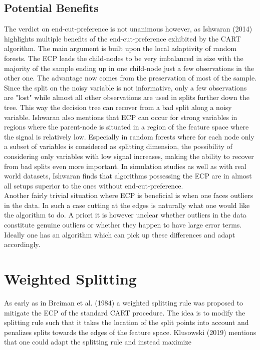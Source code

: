 \documentclass{article}
\begin{document}
\subsection{Potential Benefits}
The verdict on end-cut-preference is not unanimous however, as Ishwaran (2014) highlights multiple benefits of the end-cut-preference exhibited by the CART algorithm. The main argument is built upon the local adaptivity of random forests. The ECP leads the child-nodes to be very imbalanced in size with the majority of the sample ending up in one child-node just a few observations in the other one. The advantage now comes from the preservation of most of the sample. Since the split on the noisy variable is not informative, only a few observations are "lost" while almost all other observations are used in splits further down the tree. This way the decision tree can recover from a bad split along a noisy variable. Ishwaran also mentions that ECP can occur for strong variables in regions where the parent-node is situated in a region of the feature space where the signal is relatively low. Especially in random forests where for each node only a subset of variables is considered as splitting dimension, the possibility of considering only variables with low signal increases, making the ability to recover from bad splits even more important. In simulation studies as well as with real world datasets, Ishwaran finds that algorithms possessing the ECP are in almost all setups superior to the ones without end-cut-preference. \\
Another fairly trivial situation where ECP is beneficial is when one faces outliers in the data. In such a case cutting at the edges is naturally what one would like the algorithm to do. A priori it is however unclear whether outliers in the data constitute genuine outliers or whether they happen to have large error terms. Ideally one has an algorithm which can pick up these differences and adapt accordingly.

\section{Weighted Splitting}
As early as in Breiman et al. (1984) a weighted splitting rule was proposed to mitigate the ECP of the standard CART procedure. The idea is to modify the splitting rule such that it takes the location of the split points into account and penalizes splits towards the edges of the feature space. Klusowski (2019) mentions that one could adapt the splitting rule and instead maximize 
\end{document}
